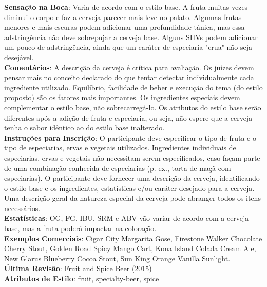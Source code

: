 \textbf{Sensação na Boca}: Varia de acordo com o estilo base. A fruta muitas vezes diminui o corpo e faz a cerveja parecer mais leve no palato. Algumas frutas menores e mais escuras podem adicionar uma profundidade tânica, mas essa adstringência não deve sobrepujar a cerveja base. Alguns SHVs podem adicionar um pouco de adstringência, ainda que um caráter de especiaria "crua" não seja desejável. \\
\textbf{Comentários}: A descrição da cerveja é crítica para avaliação. Os juízes devem pensar mais no conceito declarado do que tentar detectar individualmente cada ingrediente utilizado. Equilíbrio, facilidade de beber e execução do tema (do estilo proposto) são os fatores mais importantes. Os ingredientes especiais devem complementar o estilo base, não sobrecarregá-lo. Os atributos do estilo base serão diferentes após a adição de fruta e especiaria, ou seja, não espere que a cerveja tenha o sabor idêntico ao do estilo base inalterado. \\
\textbf{Instruções para Inscrição}: O participante deve especificar o tipo de fruta e o tipo de especiarias, ervas e vegetais utilizados. Ingredientes individuais de especiarias, ervas e vegetais não necessitam serem especificados, caso façam parte de uma combinação conhecida de especiarias (p. ex., torta de maçã com especiarias). O participante deve fornecer uma descrição da cerveja, identificando o estilo base e os ingredientes, estatísticas e/ou caráter desejado para a cerveja. Uma descrição geral da natureza especial da cerveja pode abranger todos os itens necessários. \\
\textbf{Estatísticas}: OG, FG, IBU, SRM e ABV vão variar de acordo com a cerveja base, mas a fruta poderá impactar na coloração. \\
\textbf{Exemplos Comerciais}: Cigar City Margarita Gose, Firestone Walker Chocolate Cherry Stout, Golden Road Spicy Mango Cart, Kona Island Colada Cream Ale, New Glarus Blueberry Cocoa Stout, Sun King Orange Vanilla Sunlight. \\
\textbf{Última Revisão}: Fruit and Spice Beer (2015) \\
\textbf{Atributos de Estilo}: fruit, specialty-beer, spice
